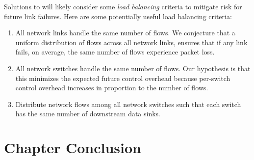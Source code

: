 Solutions to \bigpic will likely consider some \emph{load balancing} criteria to mitigate risk for future link failures.  Here are some potentially useful load balancing criteria: 
\vspace{-0.2cm}
\begin{enumerate}

	\item All network links handle the same number of flows.  We conjecture that a uniform distribution of flows across all network links, ensures that if any link fails, on average, the same number
	of flows experience packet loss.  %
	
	\item All network switches handle the same number of flows. %
	Our hypothesis is that this minimizes the expected future control overhead because  per-switch control overhead increases in proportion to the number of flows.

	\item Distribute network flows among all network switches such that each switch has the same number of downstream data sinks.
\end{enumerate}






















\section{Chapter Conclusion}
\label{sec:conclude}



